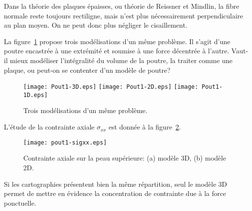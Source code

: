 \begin{histoire}
\medskip
Dans la théorie des plaques épaisses, ou théorie de Reissner
et Mindlin, la fibre normale reste
toujours rectiligne, mais n'est plus nécessairement perpendiculaire au plan moyen.
On ne peut donc plus négliger le cisaillement.
\end{histoire}

\bigskip
La figure~\ref{Pout1} propose trois modélisations d'un même problème.
Il s'agit d'une poutre encastrée à une extrémité et soumise à une force
décentrée à l'autre.
Vaut-il mieux modéliser l'intégralité du volume de la poutre, la traiter comme
une plaque, ou peut-on se contenter d'un modèle de poutre?
\begin{figure}[ht]
\centering
\texttt{[image: Pout1-3D.eps]} \hfill
\texttt{[image: Pout1-2D.eps]} \hfill
\texttt{[image: Pout1-1D.eps]}

\caption{\label{Pout1} Trois modélisations d'un même problème.}
\end{figure}

\medskip
L'étude de la contrainte axiale $\sigma_{xx}$ est donnée à la figure~\ref{Pout1-sigxx}.
\begin{figure}[ht]
\centering
\texttt{[image: pout1-sigxx.eps]}
\caption{\label{Pout1-sigxx} Contrainte axiale sur la peau supérieure: (a) modèle 3D,
(b) modèle 2D.}
\end{figure}
Si les cartographies présentent bien la même répartition, seul le modèle 3D
permet de mettre en évidence la concentration de contrainte due à la force ponctuelle.

